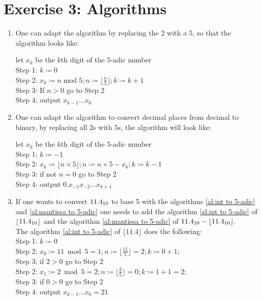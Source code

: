 \documentclass{gadsescript}
\begin{document}
\section*{Exercise 3: Algorithms}
\begin{enumerate}[label=\alph*)]
	\item One can adapt the algorithm by replacing the $ 2 $ with a $ 5 $, so that the algorithm looks like:
		\begin{algorithm}
			\label{al:int to 5-adic}
			let $ x_k $ be the $ k $th digit of the $ 5 $-adic number\\
			Step 1: $ k \coloneqq 0 $\\
			Step 2: $ x_k \coloneqq n \operatorname{mod} 5; n \coloneqq \lfloor \frac{ n }{ 5 } \rfloor; k \coloneqq k + 1 $\\
			Step 3: If $ n > 0 $ go to Step 2\\
			Step 4: output $ x_{k-1} \dotso x_0 $
		\end{algorithm}

	\item One can adapt the algorithm to convert decimal places from decimal to binary, by replacing all $ 2 $s with $ 5 $s,  the algorithm will look like:
		\begin{algorithm}
			\label{al:mantissa to 5-adic}
			let $ x_k $ be the $ k $th digit of the $ 5 $-adic number\\
			Step 1: $ k \coloneqq -1 $\\
			Step 2: $ x_k \coloneqq \lfloor n \times 5 \rfloor; n \coloneqq n \times 5 - x_k; k \coloneqq k - 1 $\\
			Step 3: if not $ n = 0 $ go to Step 2\\
			Step 4: output $ 0.x_{-1} x_{-2} \dotso x_{k+1} $
		\end{algorithm}

	\item If one wants to convert $\num{11.4}_{10}$ to base 5 with the algorithms \ref{al:int to 5-adic} and \ref{al:mantissa to 5-adic} one needs to add the algorithm \ref{al:int to 5-adic} of $ \lfloor \num{11.4}_{10} \rfloor $ and the algorithm \ref{al:mantissa to 5-adic} of $ \num{11.4}_{10} - \lfloor \num{11.4}_{10} \rfloor $.\\
		The algorithm \ref{al:int to 5-adic} of $ \lfloor \num{11.4} \rfloor $ does the following:\\
		Step 1: $ k \coloneqq 0 $\\
		Step 2: $ x_0 \coloneqq 11 \bmod{5} = 1; n \coloneqq \lfloor \frac{ 11 }{ 5 } \rfloor = 2; k \coloneqq 0 + 1; $\\
		Step 3: if $ 2 > 0 $ go to Step 2\\
		Step 2: $ x_1 \coloneqq 2 \bmod{5} = 2; n \coloneqq \lfloor \frac{ 2 }{ 5 } \rfloor = 0; k \coloneqq 1 + 1 = 2; $\\
		Step 3: if $ 0 > 0 $ go to Step 2\\
		Step 4: output $ x_{k-1} \dotso x_0 = 21 $


\end{enumerate}
\end{document}
